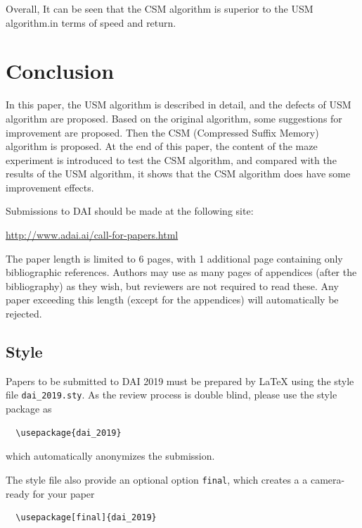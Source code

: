\documentclass{article}
\begin{document}
Overall, It can be seen that the CSM algorithm is superior to the USM algorithm.in terms of speed and return.


\section{Conclusion}

In this paper, the USM algorithm is described in detail, and the defects of USM
algorithm are proposed. Based on the original algorithm, some suggestions for improvement
are proposed. Then the CSM (Compressed Suffix Memory) algorithm is proposed. At the end of
this paper, the content of the maze experiment is introduced to test the CSM algorithm, and
compared with the results of the USM algorithm, it shows that the CSM algorithm does have
some improvement effects.



















Submissions to DAI should be made at the following site:
	\begin{center}
	  \small
	  \url{http://www.adai.ai/call-for-papers.html}
	\end{center}
The paper length is limited to 6 pages, with 1 additional page containing only 
bibliographic references. Authors may use as many pages of appendices (after 
the bibliography) as they wish, but reviewers are not required to read these.
Any paper exceeding this length (except for the appendices) will automatically 
be rejected.

\subsection{Style}

Papers to be submitted to DAI 2019 must be prepared by \LaTeX{} using the style 
file \verb+dai_2019.sty+. As the review process is double blind, please use the 
style package as 
\begin{verbatim}
  \usepackage{dai_2019}
\end{verbatim}
which automatically anonymizes the submission.

The style file also provide an optional option \verb+final+, which creates a 
a camera-ready for your paper
\begin{verbatim}
  \usepackage[final]{dai_2019}
\end{verbatim}
\end{document}
